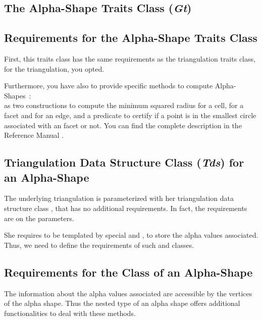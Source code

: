 \subsection*{The Alpha-Shape Traits Class (\mbox{\it Gt})\label{I1_ASTraits3D}} 

\subsection{Requirements for the Alpha-Shape Traits Class}

First, this traits class has the same requirements as the 
triangulation traits class, for the  triangulation, you opted.

Furthermore, you have also to provide specific methods to compute Alpha-Shapes~:\\
as two constructions to compute the minimum squared radius for a cell, for a
facet and for an edge, and a predicate to certify if a point is in the smallest
circle associated with an facet or not. You can find the complete description in
the Reference Manual .

\subsection*{Triangulation Data Structure Class (\mbox{\it Tds}) for an Alpha-Shape}

The underlying triangulation  is parameterized with her
triangulation data structure class , that has no additional
requirements. In fact, the requirements are on the  parameters.

She requires to be templated by special  and
, to store the alpha values associated. Thus, we need to
define the requirements of such  and
 classes.

\subsection{Requirements for the \protect {} Class of an
Alpha-Shape\label{I1_SectVertexAS3D}} 

The information about the alpha values associated  are accessible by the 
vertices of the alpha shape. Thus the nested 
type of an alpha shape offers additional functionalities to deal with these
methods.  

